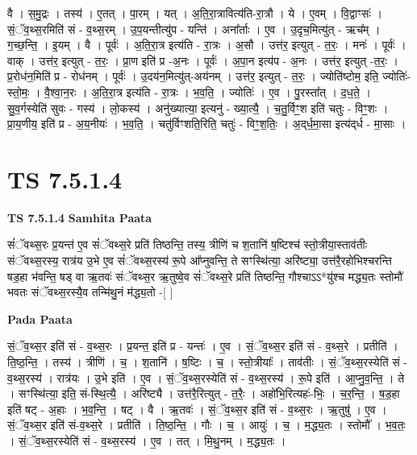 \documentclass[17pt]{extarticle}
\begin{document}
वै । स॒मु॒द्रः । तस्य॑ । ए॒तत् । पा॒रम् । यत् । अ॒ति॒रा॒त्रावित्य॑ति-रा॒त्रौ । ये । ए॒वम् । वि॒द्वाꣳसः॑ । सं॒ॅव॒थ्स॒रमिति॑ सं - व॒थ्स॒रम् । उ॒प॒यन्तीत्यु॑प - यन्ति॑ । अना᳚र्ताः । ए॒व । उ॒दृच॒मित्यु॑त् - ऋच᳚म् । ग॒च्छ॒न्ति॒ । इ॒यम् । वै । पूर्वः॑ । अ॒ति॒रा॒त्र इत्य॑ति - रा॒त्रः । अ॒सौ । उत्त॑र॒ इत्युत् - त॒रः॒ । मनः॑ । पूर्वः॑ । वाक् । उत्त॑र॒ इत्युत् - त॒रः॒ । प्रा॒ण इति॑ प्र -अ॒नः । पूर्वः॑ । अ॒पा॒न इत्य॑प -   अ॒नः । उत्त॑र॒ इत्युत् -त॒रः॒ । प्र॒रोध॑न॒मिति॑ प्र - रोध॑नम् । पूर्वः॑ । उ॒दय॑न॒मित्यु॑त्-अय॑नम् । उत्त॑र॒ इत्युत् - त॒रः॒ । ज्योति॑ष्टोम॒ इति॒ ज्योतिः॑-स्तो॒मः॒ । वै॒श्वा॒न॒रः । अ॒ति॒रा॒त्र इत्य॑ति - रा॒त्रः । भ॒व॒ति॒ । ज्योतिः॑ । ए॒व । पु॒रस्ता᳚त् । द॒ध॒ते॒ । सु॒व॒र्गस्येति॑ सुवः - गस्य॑ । लो॒कस्य॑ । अनु॑ख्यात्या॒ इत्यनु॑ - ख्या॒त्यै॒ । च॒तु॒र्विꣳ॒॒श इति॑ चतुः - विꣳ॒॒शः । प्रा॒य॒णीय॒ इति॑ प्र - अ॒य॒नीयः॑ । भ॒व॒ति॒ । चतु॑र्विꣳशति॒रिति॒ चतुः॑ - विꣳ॒॒श॒तिः॒ । अ॒द्‌र्ध॒मा॒सा इत्य॑द्‌र्ध - मा॒साः ।  \newline





\section{ TS 7.5.1.4 }

\textbf{TS 7.5.1.4 } \newline
\textbf{Samhita Paata} \newline

सं॑ॅवथ्स॒रः प्र॒यन्त॑ ए॒व सं॑ॅवथ्स॒रे प्रति॑ तिष्ठन्ति॒ तस्य॒ त्रीणि॑ च श॒तानि॑ ष॒ष्टिश्च॑ स्तो॒त्रीया॒स्ताव॑तीः संॅवथ्स॒रस्य॒ रात्र॑य उ॒भे ए॒व सं॑ॅवथ्स॒रस्य॑ रू॒पे आ᳚प्नुवन्ति॒ ते सꣳस्थि॑त्या॒ अरि॑ष्ट्या॒ उत्त॑रै॒रहो॑भिश्चरन्ति षड॒हा भ॑वन्ति॒ षड् वा ऋ॒तवः॑ संॅवथ्स॒र ऋ॒तुष्वे॒व सं॑ॅवथ्स॒रे प्रति॑ तिष्ठन्ति॒ गौश्चाऽऽ*यु॑श्च मद्ध्य॒तः स्तोमौ॑ भवतः संॅवथ्स॒रस्यै॒व तन्मि॑थु॒नं म॑द्ध्य॒तो -[  ] \newline

\textbf{Pada Paata} \newline

सं॒ॅव॒थ्स॒र इति॑ सं - व॒थ्स॒रः । प्र॒यन्त॒ इति॑ प्र - यन्तः॑ । ए॒व । सं॒ॅव॒थ्स॒र इति॑ सं - व॒थ्स॒रे । प्रतीति॑ । ति॒ष्ठ॒न्ति॒ । तस्य॑ । त्रीणि॑ । च॒ । श॒तानि॑ । ष॒ष्टिः । च॒ । स्तो॒त्रीयाः᳚ । ताव॑तीः । सं॒ॅव॒थ्स॒रस्येति॑ सं - व॒थ्स॒रस्य॑ । रात्र॑यः । उ॒भे इति॑ । ए॒व । सं॒ॅव॒थ्स॒रस्येति॑ सं - व॒थ्स॒रस्य॑ । रू॒पे इति॑ । आ॒प्नु॒व॒न्ति॒ । ते । सꣳस्थि॑त्या॒ इति॒ सं-स्थि॒त्यै॒ । अरि॑ष्ट्यै । उत्त॑रै॒रित्युत् - त॒रैः॒ । अहो॑भि॒रित्यहः॑-भिः॒ । च॒र॒न्ति॒ । ष॒ड॒हा इति॑ षट् - अ॒हाः । भ॒व॒न्ति॒ । षट् । वै । ऋ॒तवः॑ । सं॒ॅव॒थ्स॒र इति॑ सं - व॒थ्स॒रः । ऋ॒तुषु॑ । ए॒व । सं॒ॅव॒थ्स॒र इति॑ सं-व॒थ्स॒रे । प्रतीति॑ । ति॒ष्ठ॒न्ति॒ । गौः । च॒ । आयुः॑ । च॒ । म॒द्ध्य॒तः । स्तोमौ᳚ । भ॒व॒तः॒ । सं॒ॅव॒थ्स॒रस्येति॑ सं - व॒थ्स॒रस्य॑ । ए॒व । तत् । मि॒थु॒नम् । म॒द्ध्य॒तः ।  \newline
\end{document}
